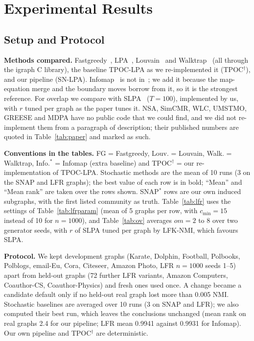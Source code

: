 \documentclass[conference]{IEEEtran}
\begin{document}
\section{Experimental Results}\label{sec:results}
\subsection{Setup and Protocol}\label{sec:setup}
\textbf{Methods compared.} Fastgreedy~\cite{clauset2004}, LPA~\cite{raghavan2007}, Louvain~\cite{blondel2008} and Walktrap~\cite{pons2006} (all through the igraph C library), the baseline TPOC-LPA as we re-implemented it (TPOC$^{\dagger}$), and our pipeline (SN-LPA). Infomap~\cite{rosvall2008} is not in~\cite{kong2026}; we add it because the map-equation merge and the boundary moves borrow from it, so it is the strongest reference. For overlap we compare with SLPA~\cite{xie2011} ($T{=}100$), implemented by us, with $r$ tuned per graph as the paper tunes it. NSA, SimCMR, WLC, UMSTMO, GREESE and MDPA have no public code that we could find, and we did not re-implement them from a paragraph of description; their published numbers are quoted in Table~\ref{tab:paper} and marked as such.

\textbf{Conventions in the tables.} FG = Fastgreedy, Louv. = Louvain, Walk. = Walktrap, Info.$^{*}$ = Infomap (extra baseline) and TPOC$^{\dagger}$ = our re-implementation of TPOC-LPA. Stochastic methods are the mean of 10 runs (3 on the SNAP and LFR graphs); the best value of each row is in bold; ``Mean'' and ``Mean rank'' are taken over the rows shown. SNAP$^{*}$ rows are our own induced subgraphs, with the first listed community as truth. Table~\ref{tab:lfr} uses the settings of Table~\ref{tab:lfrparam} (mean of 5 graphs per row, with $c_{\min}{=}15$ instead of 10 for $n{=}1000$), and Table~\ref{tab:ov} averages $om=2$ to 8 over two generator seeds, with $r$ of SLPA tuned per graph by LFK-NMI, which favours SLPA.

\textbf{Protocol.} We kept development graphs (Karate, Dolphin, Football, Polbooks, Polblogs, email-Eu, Cora, Citeseer, Amazon Photo, LFR $n{=}1000$ seeds 1--5) apart from held-out graphs (72 further LFR variants, Amazon Computers, Coauthor-CS, Coauthor-Physics) and fresh ones used once. A change became a candidate default only if no held-out real graph lost more than 0.005 NMI. Stochastic baselines are averaged over 10 runs (3 on SNAP and LFR); we also computed their best run, which leaves the conclusions unchanged (mean rank on real graphs 2.4 for our pipeline; LFR mean 0.9941 against 0.9931 for Infomap). Our own pipeline and TPOC$^{\dagger}$ are deterministic.
\end{document}
